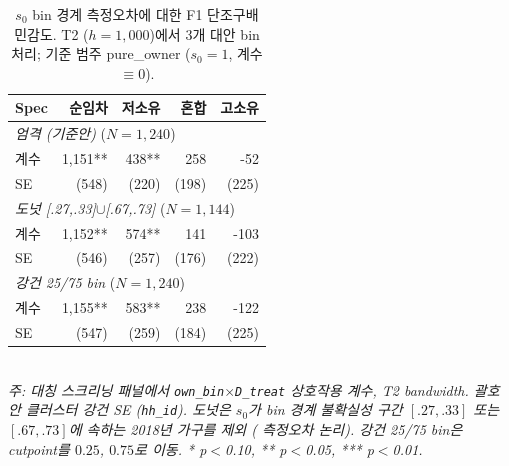 \begin{table}[t]
\centering
\caption{$s_0$ bin 경계 측정오차에 대한 F1 단조구배 민감도. T2 ($h = 1{,}000$)에서 3개 대안 bin 처리; 기준 범주 pure\_owner ($s_0 = 1$, 계수 $\equiv 0$).}
\label{tab:fuzzy_bin_sensitivity_ko}
\begin{tabular}{lrrrr}
\toprule
Spec & 순임차 & 저소유 & 혼합 & 고소유 \\
\midrule
\multicolumn{5}{l}{\textit{엄격 (기준안)} ($N = 1,240$)} \\
계수 & 1,151** & 438** & 258 & -52 \\
SE & (548) & (220) & (198) & (225) \\
\multicolumn{5}{l}{\textit{도넛 [.27,.33]$\cup$[.67,.73]} ($N = 1,144$)} \\
계수 & 1,152** & 574** & 141 & -103 \\
SE & (546) & (257) & (176) & (222) \\
\multicolumn{5}{l}{\textit{강건 25/75 bin} ($N = 1,240$)} \\
계수 & 1,155** & 583** & 238 & -122 \\
SE & (547) & (259) & (184) & (225) \\
\bottomrule
\end{tabular}
\\
\footnotesize\textit{주: 대칭 스크리닝 패널에서 \texttt{own\_bin}$\times$\texttt{D\_treat} 상호작용 계수, T2 bandwidth. 괄호 안 클러스터 강건 SE (\texttt{hh\_id}). 도넛은 $s_0$가 bin 경계 불확실성 구간 $[.27, .33]$ 또는 $[.67, .73]$에 속하는 2018년 가구를 제외 (\citealp{Roth2022_pretrends} 측정오차 논리). 강건 25/75 bin은 cutpoint를 $0.25$, $0.75$로 이동. * p$<$0.10, ** p$<$0.05, *** p$<$0.01.}
\end{table}
